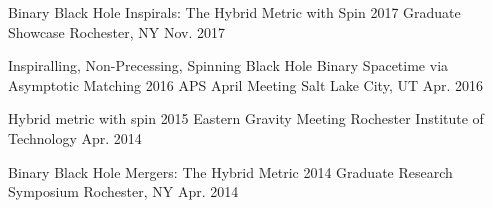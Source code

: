 \begin{cventries}
 \cventry
    {Binary Black Hole Inspirals: The Hybrid Metric with Spin}
    {2017 Graduate Showcase}
    {Rochester, NY}
    {Nov. 2017}
    {
    }

 \cventry
    {Inspiralling, Non-Precessing, Spinning Black Hole Binary Spacetime via Asymptotic Matching}
    {2016 APS April Meeting}
    {Salt Lake City, UT}
    {Apr. 2016}
    {
    }

 \cventry
    {Hybrid metric with spin}
    {2015 Eastern Gravity Meeting}
    {Rochester Institute of Technology}
    {Apr. 2014}
    {
    }    

 \cventry
    {Binary Black Hole Mergers: The Hybrid Metric}
    {2014 Graduate Research Symposium}
    {Rochester, NY}
    {Apr. 2014}
    {
    }
    
  
\end{cventries}
